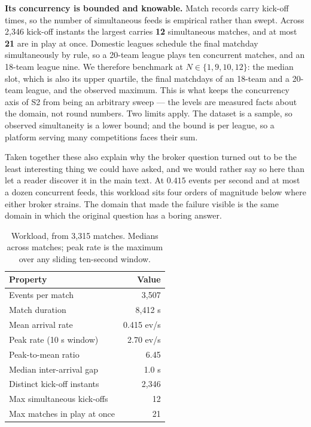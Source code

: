 \documentclass[10pt,journal,onecolumn]{IEEEtran}
\begin{document}
\textbf{Its concurrency is bounded and knowable.} Match records carry kick-off times, so the
number of simultaneous feeds is empirical rather than swept. Across 2{,}346 kick-off instants the
largest carries \textbf{12} simultaneous matches, and at most \textbf{21} are in play at once.
Domestic leagues schedule the final matchday simultaneously by rule, so a 20-team league plays
ten concurrent matches, and an 18-team league nine. We therefore benchmark at
$N \in \{1,9,10,12\}$: the median slot, which is also its upper quartile, the final matchdays of an
18-team and a 20-team league, and the observed maximum. This is what keeps the concurrency axis of S2 from being an arbitrary sweep --- the levels are
measured facts about the domain, not round numbers. Two limits apply. The dataset is a sample, so
observed simultaneity is a lower bound; and the bound is per league, so a platform serving many
competitions faces their sum.

Taken together these also explain why the broker question turned out to be the least interesting
thing we could have asked, and we would rather say so here than let a reader discover it in
the main text. At $0.415$ events per second and at most a dozen concurrent feeds, this
workload sits four orders of magnitude below where either broker strains. The domain that made
the failure visible is the same domain in which the original question has a boring answer.

\begin{table}[t]
\caption[Workload, from 3{,}315 matches]{Workload, from 3{,}315 matches. Medians across matches; peak rate is the maximum
over any sliding ten-second window.}
\label{tab:workload}
\begin{tabular}{lr}
\toprule
Property & Value \\
\midrule
Events per match & 3{,}507 \\
Match duration & 8{,}412 s \\
Mean arrival rate & 0.415 ev/s \\
Peak rate (10 s window) & 2.70 ev/s \\
Peak-to-mean ratio & 6.45 \\
Median inter-arrival gap & 1.0 s \\
\midrule
Distinct kick-off instants & 2{,}346 \\
Max simultaneous kick-offs & 12 \\
Max matches in play at once & 21 \\
\bottomrule
\end{tabular}
\end{table}
\end{document}
